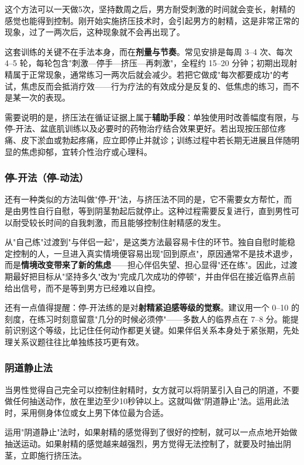 这个方法可以一天做5次，坚持数周之后，男方耐受刺激的时间就会变长，射精的感觉也能得到控制。刚开始实施挤压技术时，会引起男方的射精，这是非常正常的现象，过了一两次后，这种现象就不会再出现了。


这套训练的关键不在手法本身，而在\textbf{剂量与节奏}。常见安排是每周 3--4 次、每次 4--5 轮，每轮包含"刺激—停手—挤压—再刺激"，全程约 15--20 分钟；初期出现射精属于正常现象，通常练习一两次后就会减少。若把它做成"每次都要成功"的考试，焦虑反而会抵消疗效——行为疗法的有效成分是反复的、低焦虑的练习，而不是某一次的表现。

需要说明的是，挤压法在循证证据上属于\textbf{辅助手段}：单独使用时改善幅度有限，与停-开法、盆底肌训练以及必要时的药物治疗结合效果更好。若出现按压部位疼痛、皮下淤血或勃起疼痛，应立即停止并就诊；训练过程中若长期无进展且伴随明显的焦虑抑郁，宜转介性治疗或心理科。

\subsubsection{停-开法（停-动法）}

还有一种类似的方法叫做"停-开"法，与挤压法不同的是，它不需要女方帮忙，而是由男性自行自慰，等到阴茎勃起后就停止。这种过程需要反复进行，直到男性可以耐受较长时间的自我刺激，而且能够控制住射精感的发生。


从"自己练"过渡到"与伴侣一起"，是这类方法最容易卡住的环节。独自自慰时能稳定控制的人，一旦进入真实情境便容易出现"回到原点"，原因通常不是技术退步，而是\textbf{情境改变带来了新的焦虑}——担心伴侣失望、担心显得"还在练"。因此，过渡期最好把目标从"坚持多久"改为"完成几次成功的停顿"，并由伴侣在接近临界点前给出信号，而不是等到男方已经难以自控。

还有一点值得提醒：停-开法练的是对\textbf{射精紧迫感等级的觉察}。建议用一个 0--10 的刻度，在练习时刻意留意"几分的时候必须停"——多数人的临界点在 7--8 分。能提前识别这个等级，比记住任何动作都更关键。如果伴侣关系本身处于紧张期，先处理关系议题往往比单独练技巧更有效。

\subsubsection{阴道静止法}

当男性觉得自己完全可以控制住射精时，女方就可以将阴茎引入自己的阴道，不要做任何抽送动作，放在里边至少10秒钟以上。这就叫做"阴道静止"法。运用此法时，采用侧身体位或女上男下体位最为合适。

运用"阴道静止"法时，如果射精的感觉得到了很好的控制，就可以一点点地开始做抽送运动。如果射精的感觉越来越强烈，男方觉得无法控制了，就要及时抽出阴茎，立即施行挤压法。

